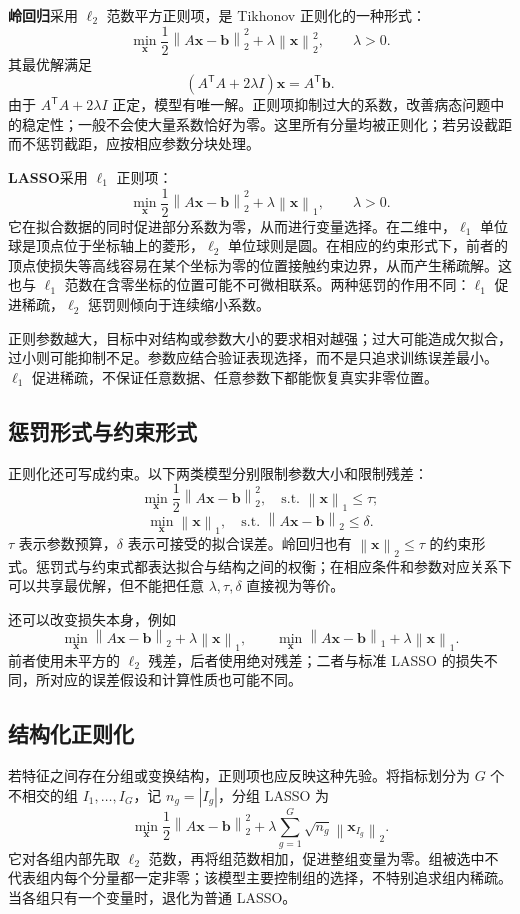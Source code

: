 \documentclass[UTF8,fontset=fandol,a4paper,12pt]{ctexart}
\newcommand{\vx}{\boldsymbol x}
\newcommand{\vb}{\boldsymbol b}
\newcommand{\norm}[1]{\left\lVert#1\right\rVert}
\theoremstyle{definition}
\begin{document}
\textbf{岭回归}采用 $\ell_2$ 范数平方正则项，是 Tikhonov 正则化的一种形式：
\begin{equation}\label{eq:ridge}
 \boxed{\min_{\vx}\frac12\norm{A\vx-\vb}_2^2+\lambda\norm{\vx}_2^2,
 \qquad\lambda>0.}
\end{equation}
其最优解满足
\[
 (A^{\mathsf T}A+2\lambda I)\vx=A^{\mathsf T}\vb.
\]
由于 $A^{\mathsf T}A+2\lambda I$ 正定，模型有唯一解。正则项抑制过大的系数，改善病态问题中的稳定性；一般不会使大量系数恰好为零。这里所有分量均被正则化；若另设截距而不惩罚截距，应按相应参数分块处理。

\textbf{LASSO}采用 $\ell_1$ 正则项：
\begin{equation}\label{eq:lasso}
 \boxed{\min_{\vx}\frac12\norm{A\vx-\vb}_2^2+\lambda\norm{\vx}_1,
 \qquad\lambda>0.}
\end{equation}
它在拟合数据的同时促进部分系数为零，从而进行变量选择。在二维中，$\ell_1$ 单位球是顶点位于坐标轴上的菱形，$\ell_2$ 单位球则是圆。在相应的约束形式下，前者的顶点使损失等高线容易在某个坐标为零的位置接触约束边界，从而产生稀疏解。这也与 $\ell_1$ 范数在含零坐标的位置可能不可微相联系。两种惩罚的作用不同：$\ell_1$ 促进稀疏，$\ell_2$ 惩罚则倾向于连续缩小系数。

正则参数越大，目标中对结构或参数大小的要求相对越强；过大可能造成欠拟合，过小则可能抑制不足。参数应结合验证表现选择，而不是只追求训练误差最小。$\ell_1$ 促进稀疏，不保证任意数据、任意参数下都能恢复真实非零位置。

\subsection{惩罚形式与约束形式}
正则化还可写成约束。以下两类模型分别限制参数大小和限制残差：
\[
 \min_{\vx}\frac12\norm{A\vx-\vb}_2^2,
 \quad\text{s.t. }\norm{\vx}_1\le\tau;
\]
\[
 \min_{\vx}\norm{\vx}_1,
 \quad\text{s.t. }\norm{A\vx-\vb}_2\le\delta.
\]
$\tau$ 表示参数预算，$\delta$ 表示可接受的拟合误差。岭回归也有 $\norm{\vx}_2\le\tau$ 的约束形式。惩罚式与约束式都表达拟合与结构之间的权衡；在相应条件和参数对应关系下可以共享最优解，但不能把任意 $\lambda,\tau,\delta$ 直接视为等价。

还可以改变损失本身，例如
\[
 \min_{\vx}\norm{A\vx-\vb}_2+\lambda\norm{\vx}_1,
 \qquad
 \min_{\vx}\norm{A\vx-\vb}_1+\lambda\norm{\vx}_1.
\]
前者使用未平方的 $\ell_2$ 残差，后者使用绝对残差；二者与标准 LASSO 的损失不同，所对应的误差假设和计算性质也可能不同。

\subsection{结构化正则化}
若特征之间存在分组或变换结构，正则项也应反映这种先验。将指标划分为 $G$ 个不相交的组 $I_1,\ldots,I_G$，记 $n_g=|I_g|$，分组 LASSO 为
\[
 \min_{\vx}\frac12\norm{A\vx-\vb}_2^2
 +\lambda\sum_{g=1}^G\sqrt{n_g}\norm{\vx_{I_g}}_2.
\]
它对各组内部先取 $\ell_2$ 范数，再将组范数相加，促进整组变量为零。组被选中不代表组内每个分量都一定非零；该模型主要控制组的选择，不特别追求组内稀疏。当各组只有一个变量时，退化为普通 LASSO。
\end{document}
